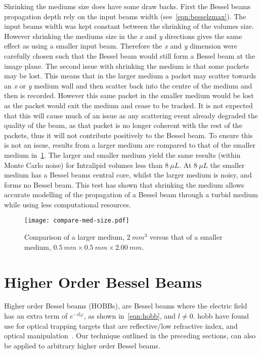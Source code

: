 Shrinking the mediums size does have some draw backs.
First the Bessel beams propagation depth rely on the input beams width (see~\cref{eqn:besselzmax}).
The input beams width was kept constant between the shrinking of the volumes size.
However shrinking the mediums size in the \textit{x} and \textit{y} directions gives the same effect as using a smaller input beam.
Therefore the \textit{x} and \textit{y} dimension were carefully chosen such that the Bessel beam would still form a Bessel beam at the image plane.
The second issue with shrinking the medium is that some packets may be lost.
This means that in the larger medium a packet may scatter towards an \textit{x} or \textit{y} medium wall and then scatter back into the centre of the medium and then is recorded.
However this same packet in the smaller medium would be lost as the packet would exit the medium and cease to be tracked.
It is not expected that this will cause much of an issue as any scattering event already degraded the quality of the beam, as that packet is no longer coherent with the rest of the packets, thus it will not contribute positively to the Bessel beam.
To ensure this is not an issue, results from a larger medium are compared to that of the smaller medium in~\cref{fig:compareBigSmall}.
The larger and smaller medium yield the same results (within Monte Carlo noise) for Intralipid volumes less than $8~\mu L$.
At $8~\mu L$ the smaller medium has a Bessel beams central core, whilst the larger medium is noisy, and forms no Bessel beam.
This test has shown that shrinking the medium allows accurate modelling of the propagation of a Bessel beam through a turbid medium while using less computational resources.

\begin{figure}[!ht]
    \centering
    \texttt{[image: compare-med-size.pdf]}
    \caption{Comparison of a larger medium, $2~mm^3$ versus that of a smaller medium, $0.5~mm \times 0.5~mm \times 2.00~mm$.}
    \label{fig:compareBigSmall}
\end{figure}

\FloatBarrier

\section{Higher Order Bessel Beams}

Higher order Bessel beams (HOBBs), are Bessel beams where the electric field has an extra term of $e^{-il\varphi}$, as shown in~\cref{eqn:hobb}, and $l \neq 0$.
\Gls*{hobb} have found use for optical trapping targets that are reflective/low refractive index, and optical manipulation~\cite{garces2002transfer,garces2003observation}.
Our technique outlined in the preceding sections, can also be applied to arbitrary higher order Bessel beams. 

